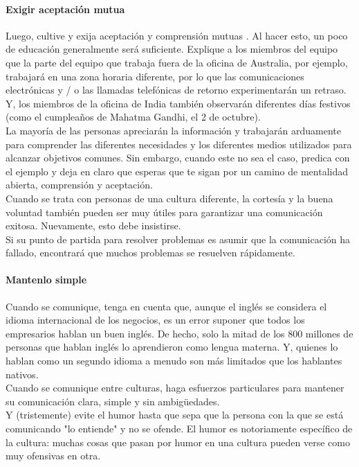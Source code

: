 \documentclass[10pt]{book}
\begin{document}
\paragraph{Exigir aceptación mutua}
Luego, cultive y exija aceptación y comprensión mutuas . Al hacer esto, un poco de educación generalmente será suficiente. Explique a los miembros del equipo que la parte del equipo que trabaja fuera de la oficina de Australia, por ejemplo, trabajará en una zona horaria diferente, por lo que las comunicaciones electrónicas y / o las llamadas telefónicas de retorno experimentarán un retraso. Y, los miembros de la oficina de India también observarán diferentes días festivos (como el cumpleaños de Mahatma Gandhi, el 2 de octubre).\\
La mayoría de las personas apreciarán la información y trabajarán arduamente para comprender las diferentes necesidades y los diferentes medios utilizados para alcanzar objetivos comunes. Sin embargo, cuando este no sea el caso, predica con el ejemplo y deja en claro que esperas que te sigan por un camino de mentalidad abierta, comprensión y aceptación.\\
Cuando se trata con personas de una cultura diferente, la cortesía y la buena voluntad también pueden ser muy útiles para garantizar una comunicación exitosa. Nuevamente, esto debe insistirse.\\
Si su punto de partida para resolver problemas es asumir que la comunicación ha fallado, encontrará que muchos problemas se resuelven rápidamente.
\paragraph{Mantenlo simple}
Cuando se comunique, tenga en cuenta que, aunque el inglés se considera el idioma internacional de los negocios, es un error suponer que todos los empresarios hablan un buen inglés. De hecho, solo la mitad de los 800 millones de personas que hablan inglés lo aprendieron como lengua materna. Y, quienes lo hablan como un segundo idioma a menudo son más limitados que los hablantes nativos.\\
Cuando se comunique entre culturas, haga esfuerzos particulares para mantener su comunicación clara, simple y sin ambigüedades.\\
Y (tristemente) evite el humor hasta que sepa que la persona con la que se está comunicando "lo entiende" y no se ofende. El humor es notoriamente específico de la cultura: muchas cosas que pasan por humor en una cultura pueden verse como muy ofensivas en otra.
\end{document}
